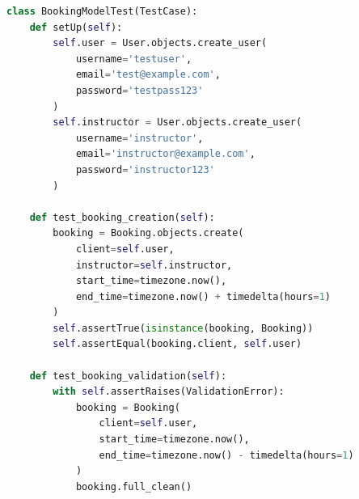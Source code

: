 \begin{tcolorbox}[colback=light,colframe=primary,title=Test Cases]
\begin{lstlisting}[language=Python]
class BookingModelTest(TestCase):
    def setUp(self):
        self.user = User.objects.create_user(
            username='testuser',
            email='test@example.com',
            password='testpass123'
        )
        self.instructor = User.objects.create_user(
            username='instructor',
            email='instructor@example.com',
            password='instructor123'
        )

    def test_booking_creation(self):
        booking = Booking.objects.create(
            client=self.user,
            instructor=self.instructor,
            start_time=timezone.now(),
            end_time=timezone.now() + timedelta(hours=1)
        )
        self.assertTrue(isinstance(booking, Booking))
        self.assertEqual(booking.client, self.user)

    def test_booking_validation(self):
        with self.assertRaises(ValidationError):
            booking = Booking(
                client=self.user,
                start_time=timezone.now(),
                end_time=timezone.now() - timedelta(hours=1)
            )
            booking.full_clean()
\end{lstlisting}
\end{tcolorbox}

